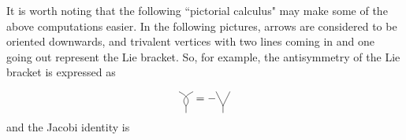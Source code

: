 It is worth noting that the following ``pictorial calculus" may make some of the above
computations easier.  In the following pictures, arrows are considered to be oriented
downwards, and trivalent vertices with two lines coming in and one going out represent
the Lie bracket.  So, for example, the antisymmetry of the Lie bracket is expressed as

  \[\begin{xy}<\diagramsize,0em>:
   (0,.5);(.5,-.5) **\crv{(1,0)},
   (1,.5);(.5,-.5) **\crv{(0,0)},
   (.5,-.5);(.5,-1) **@{-},
 \end{xy}
 = -
 \begin{xy}<\diagramsize,0em>:
   (0,.5);(.5,-.5) **@{-},
   (1,.5);(.5,-.5) **@{-},
   (.5,-.5);(.5,-1) **@{-},
 \end{xy}
 \]
and the Jacobi identity is

